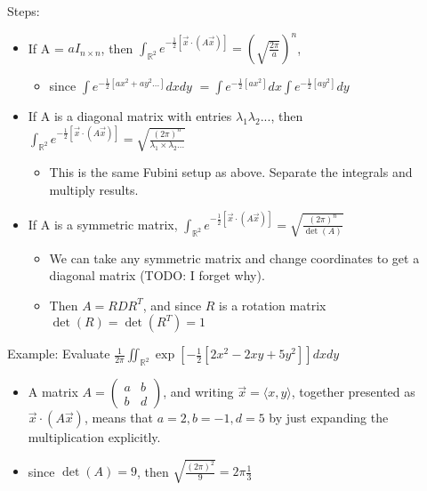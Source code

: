 \documentclass[11pt, oneside]{article}   	%
\begin{document}
Steps:
\begin{itemize}

\item If A = $aI_{n \times n}$, then $\int_{\mathbb{R}^2} e^{-\frac{1}{2} [\vec{x} \cdot (A\vec{x})]} =  (\sqrt{\frac{2\pi}{a}})^n$,
\begin{itemize}
\item since $\int e^{-\frac{1}{2}[ax^2 + ay^2...]} dx dy$
$=  \int e^{-\frac{1}{2}[ax^2]} dx \int e^{-\frac{1}{2}[ay^2]} dy$
\end{itemize}

\item If A is a diagonal matrix with entries $\lambda_1 \lambda_2...$, then $\int_{\mathbb{R}^2} e^{-\frac{1}{2} [\vec{x} \cdot (A\vec{x})]} = \sqrt{\frac{(2\pi)^n}{\lambda_1 \times \lambda_2 ...}}$
\begin{itemize}
\item This is the same Fubini setup as above.  Separate the integrals and multiply results.
\end{itemize}

\item  If A is a symmetric matrix, $\int_{\mathbb{R}^2} e^{-\frac{1}{2} [\vec{x} \cdot (A\vec{x})]} = \sqrt{\frac{(2\pi)^n}{\det(A)}}$
\begin{itemize}
\item We can take any symmetric matrix and change coordinates to get a diagonal matrix  (TODO: I forget why).
\item Then $A = RDR^T$, and since $R$ is a rotation matrix $\det(R) = \det(R^T) = 1$
\end{itemize}

\end{itemize}

Example: Evaluate $\frac{1}{2\pi} \iint_{\mathbb{R}^2} \exp [-\frac{1}{2}[2x^2 - 2xy + 5y^2]]dx dy$
\begin{itemize}
\item A matrix $A = \begin{pmatrix} a & b \\ b & d \end{pmatrix}$, and writing $\vec{x} = \langle x, y \rangle$, together presented as $\vec{x}\cdot(A\vec{x})$, means that $a = 2, b = -1, d = 5$ by just expanding the multiplication explicitly.
\item since $\det(A) = 9$, then $\sqrt{\frac{(2\pi)^2}{9}} = 2\pi \frac{1}{3}$
\end{itemize}
\end{document}
